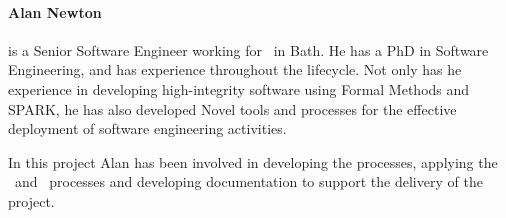 \paragraph{Alan Newton}\label{AlanNewton} is a Senior Software Engineer
working for \altran\ in Bath. He has a PhD in Software Engineering,
and has experience throughout the lifecycle. Not only has he
experience in developing high-integrity software using Formal Methods
and SPARK, he has also developed Novel tools and processes for the
effective deployment of software engineering activities.

In this project Alan has been involved in developing the processes,
applying the \reveal\ and \informed\ processes and developing
documentation to support the delivery of the project.
